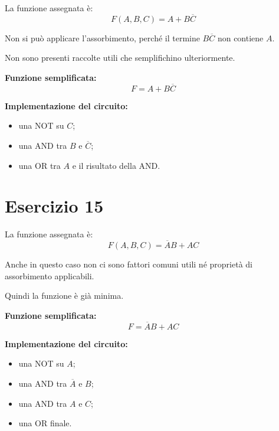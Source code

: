 \documentclass[a4paper,12pt]{article}
\begin{document}
	La funzione assegnata è:
	\[
	F(A,B,C)=A+B\overline{C}
	\]
	
	Non si può applicare l'assorbimento, perché il termine $B\overline{C}$ non contiene $A$.
	
	Non sono presenti raccolte utili che semplifichino ulteriormente.
	
	\textbf{Funzione semplificata:}
	\[
	\boxed{F=A+B\overline{C}}
	\]
	
	\textbf{Implementazione del circuito:}
	\begin{itemize}
		\item una NOT su $C$;
		\item una AND tra $B$ e $\overline{C}$;
		\item una OR tra $A$ e il risultato della AND.
	\end{itemize}
	
	\bigskip
	
	\section*{Esercizio 15}
	
	La funzione assegnata è:
	\[
	F(A,B,C)=\overline{A}B+AC
	\]
	
	Anche in questo caso non ci sono fattori comuni utili né proprietà di assorbimento applicabili.
	
	Quindi la funzione è già minima.
	
	\textbf{Funzione semplificata:}
	\[
	\boxed{F=\overline{A}B+AC}
	\]
	
	\textbf{Implementazione del circuito:}
	\begin{itemize}
		\item una NOT su $A$;
		\item una AND tra $\overline{A}$ e $B$;
		\item una AND tra $A$ e $C$;
		\item una OR finale.
	\end{itemize}
	
\end{document}
